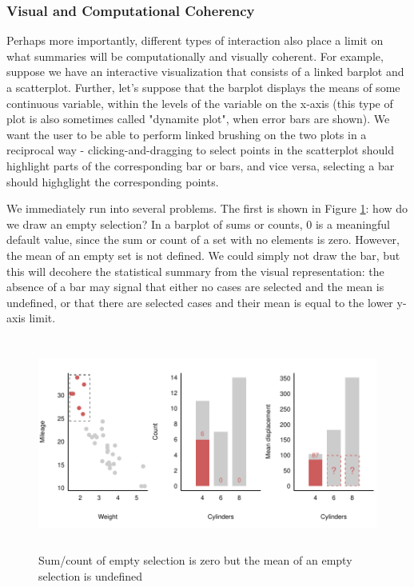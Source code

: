 \documentclass[12pt,a4paper]{article}
\begin{document}
\subsubsection{Visual and Computational Coherency}
\label{sec:coherency}

Perhaps more importantly, different types of interaction also place a limit on what summaries will be computationally and visually coherent. For example, suppose we have an interactive visualization that consists of a linked barplot and a scatterplot. Further, let's suppose that the barplot displays the means of some continuous variable, within the levels of the variable on the x-axis (this type of plot is also sometimes called "dynamite plot", when error bars are shown). We want the user to be able to perform linked brushing on the two plots in a reciprocal way - clicking-and-dragging to select points in the scatterplot should highlight parts of the corresponding bar or bars, and vice versa, selecting a bar should highglight the corresponding points.

We immediately run into several problems. The first is shown in Figure \ref{fig:empty}: how do we draw an empty selection? In a barplot of sums or counts, 0 is a meaningful default value, since the sum or count of a set with no elements is zero. However, the mean of an empty set is not defined. We could simply not draw the bar, but this will decohere the statistical summary from the visual representation: the absence of a bar may signal that either no cases are selected and the mean is undefined, or that there are selected cases and their mean is equal to the lower y-axis limit.

\begin{figure}[H]
\centering
\includegraphics[height=70mm]{./figure01.pdf}
\caption{Sum/count of empty selection is zero but the mean of an empty selection is undefined}
\label{fig:empty}
\end{figure}
\end{document}
